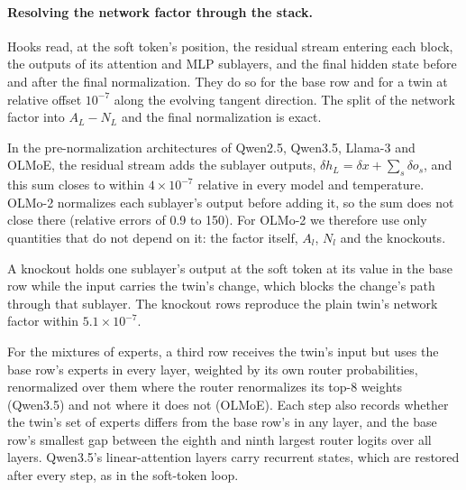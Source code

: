 \documentclass[11pt,letterpaper]{article}
\begin{document}
\paragraph{Resolving the network factor through the stack.} Hooks read, at the soft token's position, the residual
stream entering each block, the outputs of its attention and MLP sublayers, and the final hidden state before and
after the final normalization. They do so for the base row and for a twin at relative offset $10^{-7}$ along the
evolving tangent direction. The split of the network factor into $A_L-N_L$ and the final normalization is exact.

In the pre-normalization architectures of Qwen2.5, Qwen3.5, Llama-3 and OLMoE, the residual stream adds the sublayer
outputs, $\delta h_L=\delta x+\sum_s\delta o_s$, and this sum closes to within $4\times10^{-7}$ relative in every
model and temperature. OLMo-2 normalizes each sublayer's output before adding it, so the sum does not close there (relative
errors of 0.9 to 150). For OLMo-2 we therefore use only quantities that do not depend on it: the factor itself, $A_l$,
$N_l$ and the knockouts.

A knockout holds one sublayer's output at the soft token at its value in the base row while the input carries the
twin's change, which blocks the change's path through that sublayer. The knockout rows reproduce the plain twin's
network factor within $5.1\times10^{-7}$.

For the mixtures of experts, a third row receives the twin's input but uses the base row's experts in every layer,
weighted by its own router probabilities, renormalized over them where the router renormalizes its top-8 weights
(Qwen3.5) and not where it does not (OLMoE). Each
step also records whether the twin's set of experts differs from the base row's in any layer, and the base row's
smallest gap between the eighth and ninth largest router logits over all layers. Qwen3.5's linear-attention layers
carry recurrent states, which are restored after every step, as in the soft-token loop.
\end{document}
